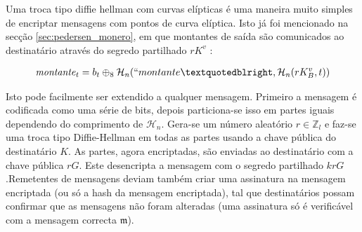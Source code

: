 Uma troca tipo diffie hellman com curvas elípticas é uma maneira muito simples de encriptar mensagens com pontos de curva elíptica. Isto já foi mencionado na secção \ref{sec:pedersen_monero}, em que montantes de saída são comunicados ao destinatário através do segredo partilhado $r K^v$ :  

\begin{align*}
\mathit{montante}_t = b_t \oplus_8 \mathcal{H}_n(``montante”, \mathcal{H}_n(r K_B^v, t))
\end{align*}

Isto pode facilmente ser extendido a qualquer mensagem. Primeiro a mensagem é codificada como uma série de bits, depois particiona-se isso em partes iguais dependendo do comprimento de $\mathcal{H}_n$. Gera-se um número aleatório $r \in \mathbb{Z}_l$ e faz-se uma troca tipo Diffie-Hellman em todas as partes usando a chave pública do destinatário $K$. As partes, agora encriptadas, são enviadas ao destinatário com a chave pública $r G$. Este desencripta a mensagem com o segredo partilhado $k r G$.\newline Remetentes de mensagens deviam também criar uma assinatura na mensagem encriptada (ou só a hash da mensagem encriptada), tal que destinatários possam confirmar que as mensagens não foram alteradas (uma assinatura só é verificável com a mensagem correcta $\mathfrak{m}$).   


